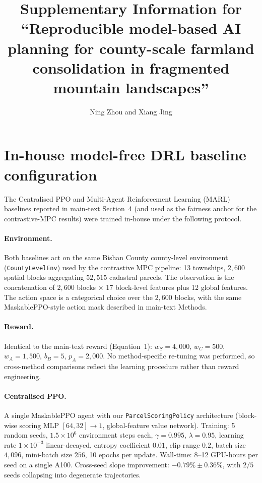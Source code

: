 \documentclass[11pt]{article}
\title{Supplementary Information for\\``Reproducible model-based AI planning for county-scale farmland consolidation in fragmented mountain landscapes''}
\author{Ning Zhou and Xiang Jing}
\date{}
\begin{document}
\maketitle
\sloppy  %

\section{In-house model-free DRL baseline configuration}\label{si:s1-drl}

The Centralised PPO and Multi-Agent Reinforcement Learning (MARL) baselines reported in main-text Section~4 (and used as the fairness anchor for the contrastive-MPC results) were trained in-house under the following protocol.

\paragraph{Environment.} Both baselines act on the same Bishan County county-level environment (\texttt{CountyLevelEnv}) used by the contrastive MPC pipeline: 13 townships, $2{,}600$ spatial blocks aggregating $52{,}515$ cadastral parcels. The observation is the concatenation of $2{,}600$ blocks $\times$ 17 block-level features plus 12 global features. The action space is a categorical choice over the $2{,}600$ blocks, with the same MaskablePPO-style action mask described in main-text Methods.

\paragraph{Reward.} Identical to the main-text reward (Equation~1): $w_S = 4{,}000$, $w_C = 500$, $w_A = 1{,}500$, $b_B = 5$, $p_A = 2{,}000$. No method-specific re-tuning was performed, so cross-method comparisons reflect the learning procedure rather than reward engineering.

\paragraph{Centralised PPO.} A single MaskablePPO agent with our \texttt{ParcelScoringPolicy} architecture (block-wise scoring MLP $[64, 32] \to 1$, global-feature value network). Training: 5 random seeds, $1.5 \times 10^6$ environment steps each, $\gamma = 0.995$, $\lambda = 0.95$, learning rate $1\times 10^{-3}$ linear-decayed, entropy coefficient $0.01$, clip range $0.2$, batch size $4{,}096$, mini-batch size $256$, 10 epochs per update. Wall-time: 8--12 GPU-hours per seed on a single A100. Cross-seed slope improvement: $-0.79\% \pm 0.36\%$, with $2/5$ seeds collapsing into degenerate trajectories.
\end{document}
